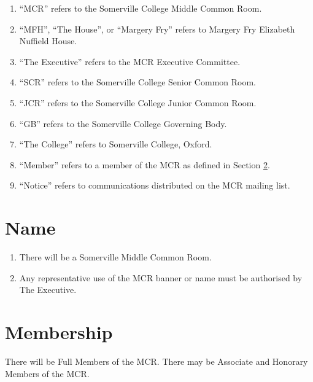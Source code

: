 \documentclass[11pt, a4paper]{article}
\begin{document}
\begin{enumerate}
    \item ``MCR'' refers to the Somerville College Middle Common Room.
    \item ``MFH'', ``The House'', or ``Margery Fry'' refers to Margery Fry Elizabeth Nuffield House.
    \item ``The Executive'' refers to the MCR Executive Committee.
    \item ``SCR'' refers to the Somerville College Senior Common Room.
    \item ``JCR'' refers to the Somerville College Junior Common Room.
    \item ``GB'' refers to the Somerville College Governing Body.
    \item ``The College'' refers to Somerville College, Oxford.
    \item ``Member'' refers to a member of the MCR as defined in Section \ref{sec:membership}.
    \item ``Notice'' refers to communications distributed on the MCR mailing list.
\end{enumerate}





\section{Name}
\label{sec:name}

\begin{enumerate}
    \item There will be a Somerville Middle Common Room.
    \item Any representative use of the MCR banner or name must be authorised by The Executive.
\end{enumerate}





\section{Membership}
\label{sec:membership}

There will be Full Members of the MCR.
There may be Associate and Honorary Members of the MCR.
\end{document}
